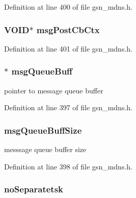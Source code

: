 Definition at line 400 of file gsn\_\-mdns.h.

\hypertarget{a00144_ae2825f88703448135895148a789564ed}{
\subsubsection[{msgPostCbCtx}]{\setlength{\rightskip}{0pt plus 5cm}VOID$\ast$ {\bf msgPostCbCtx}}}
\label{a00144_ae2825f88703448135895148a789564ed}


Definition at line 401 of file gsn\_\-mdns.h.

\hypertarget{a00144_a7e51f5f5131592004e739bcc100a27fc}{
\subsubsection[{msgQueueBuff}]{$\ast$ {\bf msgQueueBuff}}}
\label{a00144_a7e51f5f5131592004e739bcc100a27fc}
pointer to message queue buffer 

Definition at line 397 of file gsn\_\-mdns.h.

\hypertarget{a00144_a21640f5a1df0caa651f4ffe4280d6210}{
\subsubsection[{msgQueueBuffSize}]{ {\bf msgQueueBuffSize}}}
\label{a00144_a21640f5a1df0caa651f4ffe4280d6210}
messsage queue buffer size 

Definition at line 398 of file gsn\_\-mdns.h.

\hypertarget{a00144_a8d3f646fa21e09b46466bac533ff66e7}{
\subsubsection[{noSeparatetsk}]{ {\bf noSeparatetsk}}}
\label{a00144_a8d3f646fa21e09b46466bac533ff66e7}


